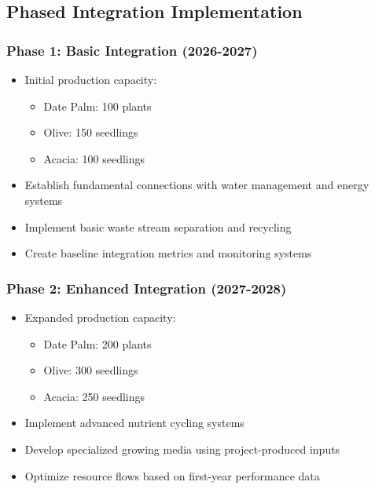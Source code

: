 \subsection{Phased Integration Implementation}

\subsubsection{Phase 1: Basic Integration (2026-2027)}
\begin{itemize}
    \item Initial production capacity:
    \begin{itemize}
        \item Date Palm: 100 plants
        \item Olive: 150 seedlings
        \item Acacia: 100 seedlings
    \end{itemize}
    \item Establish fundamental connections with water management and energy systems
    \item Implement basic waste stream separation and recycling
    \item Create baseline integration metrics and monitoring systems
\end{itemize}

\subsubsection{Phase 2: Enhanced Integration (2027-2028)}
\begin{itemize}
    \item Expanded production capacity:
    \begin{itemize}
        \item Date Palm: 200 plants
        \item Olive: 300 seedlings
        \item Acacia: 250 seedlings
    \end{itemize}
    \item Implement advanced nutrient cycling systems
    \item Develop specialized growing media using project-produced inputs
    \item Optimize resource flows based on first-year performance data
\end{itemize}

